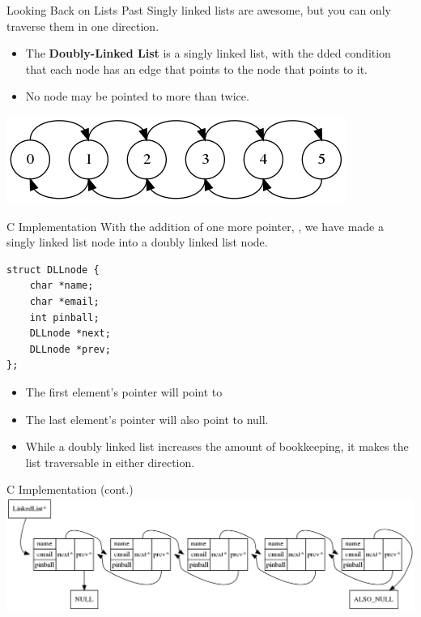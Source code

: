 \documentclass[11pt]{beamer}
\let\OldTexttt\texttt
\renewcommand{\texttt}[1]{\OldTexttt{\color{teal}{#1}}}
\begin{document}
\begin{frame}{Looking Back on Lists Past}
Singly linked lists are awesome, but you can only traverse them in one direction. 
\begin{itemize}
\item The \textbf{Doubly-Linked List} is a singly linked list, with the dded condition that each node has an edge that points to the node that points to it.  
\item No node may be pointed to more than twice.  
\end{itemize}
\center
\includegraphics[scale=0.4]{graphs/DLL_simple.png}
\end{frame}

\begin{frame}[fragile=singleslide]{C Implementation}
With the addition of one more pointer, \texttt{*prev}, we have made a singly linked list node into a doubly linked list node.
\begin{lstlisting}[style=C]
struct DLLnode {
	char *name;
	char *email;
	int pinball;
	DLLnode *next;
	DLLnode *prev;
};
\end{lstlisting} 
\begin{itemize}
\item The first element's \texttt{prev} pointer will point to \texttt{NULL}
\item The last element's \texttt{next} pointer will also point to null.
\item While a doubly linked list increases the amount of bookkeeping, it makes the list traversable in either direction.  
\end{itemize}
\end{frame}

\begin{frame}{C Implementation (cont.)}
\center
\includegraphics[scale=0.3]{graphs/DLL.png}
\end{frame}
\end{document}
